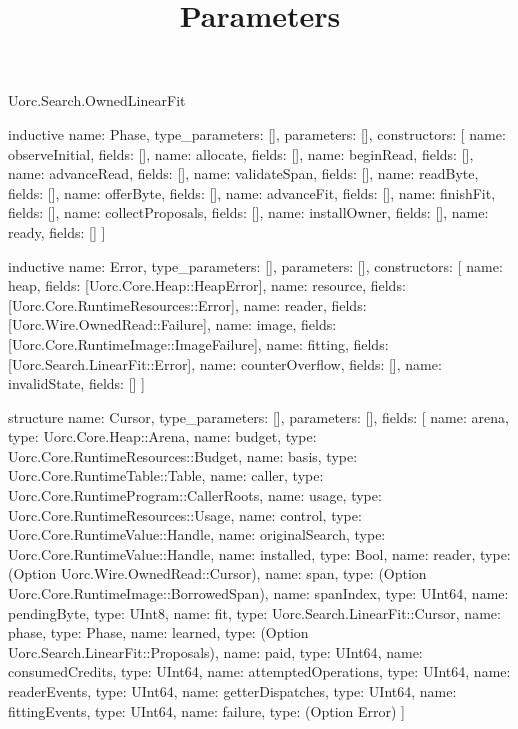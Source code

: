 \begin{lexlean}{Uorc.Search.OwnedLinearFit}
\title{Parameters}
\begin{semanticmodule}
inductive{
  name: Phase,
  type_parameters: [],
  parameters: [],
  constructors: [
    {name: observeInitial, fields: []},
    {name: allocate, fields: []},
    {name: beginRead, fields: []},
    {name: advanceRead, fields: []},
    {name: validateSpan, fields: []},
    {name: readByte, fields: []},
    {name: offerByte, fields: []},
    {name: advanceFit, fields: []},
    {name: finishFit, fields: []},
    {name: collectProposals, fields: []},
    {name: installOwner, fields: []},
    {name: ready, fields: []}
  ]
}

inductive{
  name: Error,
  type_parameters: [],
  parameters: [],
  constructors: [
    {name: heap, fields: [Uorc.Core.Heap::HeapError]},
    {name: resource, fields: [Uorc.Core.RuntimeResources::Error]},
    {name: reader, fields: [Uorc.Wire.OwnedRead::Failure]},
    {name: image, fields: [Uorc.Core.RuntimeImage::ImageFailure]},
    {name: fitting, fields: [Uorc.Search.LinearFit::Error]},
    {name: counterOverflow, fields: []},
    {name: invalidState, fields: []}
  ]
}

structure{
  name: Cursor,
  type_parameters: [],
  parameters: [],
  fields: [
    {name: arena, type: Uorc.Core.Heap::Arena},
    {name: budget, type: Uorc.Core.RuntimeResources::Budget},
    {name: basis, type: Uorc.Core.RuntimeTable::Table},
    {name: caller, type: Uorc.Core.RuntimeProgram::CallerRoots},
    {name: usage, type: Uorc.Core.RuntimeResources::Usage},
    {name: control, type: Uorc.Core.RuntimeValue::Handle},
    {name: originalSearch, type: Uorc.Core.RuntimeValue::Handle},
    {name: installed, type: Bool},
    {name: reader, type: (Option Uorc.Wire.OwnedRead::Cursor)},
    {name: span, type: (Option Uorc.Core.RuntimeImage::BorrowedSpan)},
    {name: spanIndex, type: UInt64},
    {name: pendingByte, type: UInt8},
    {name: fit, type: Uorc.Search.LinearFit::Cursor},
    {name: phase, type: Phase},
    {name: learned, type: (Option Uorc.Search.LinearFit::Proposals)},
    {name: paid, type: UInt64},
    {name: consumedCredits, type: UInt64},
    {name: attemptedOperations, type: UInt64},
    {name: readerEvents, type: UInt64},
    {name: getterDispatches, type: UInt64},
    {name: fittingEvents, type: UInt64},
    {name: failure, type: (Option Error)}
  ]
}


\end{semanticmodule}
\end{lexlean}
